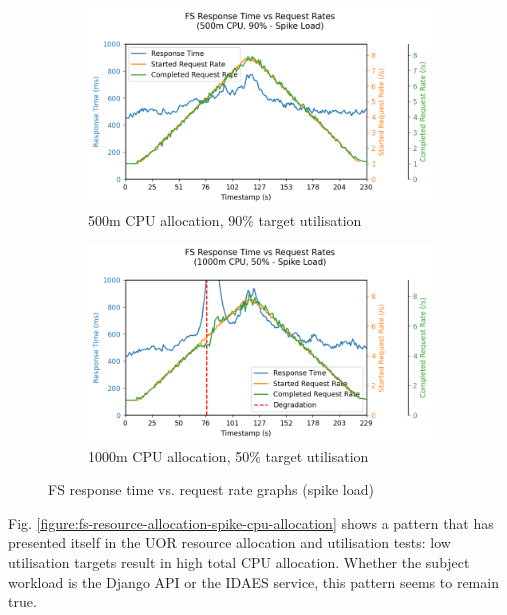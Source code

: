 \begin{figure}[h]
    \centering
    \begin{subfigure}{.5\textwidth}
      \centering
      \includegraphics[width=\linewidth]{figures/fs-rau-i4-response-curve-spike.png}
      \caption{500m CPU allocation, 90\% target utilisation}
    \end{subfigure}%
    \begin{subfigure}{.5\textwidth}
      \centering
      \includegraphics[width=\linewidth]{figures/fs-rau-i6-response-curve-spike.png}
      \caption{1000m CPU allocation, 50\% target utilisation}
    \end{subfigure}

    \caption{FS response time vs. request rate graphs (spike load)}
    \label{figure:fs-resource-allocation-rt-graph-i4-i6-spike}
\end{figure}

\noindent Fig. \ref{figure:fs-resource-allocation-spike-cpu-allocation} shows a pattern that has presented itself in the UOR resource allocation and utilisation tests: low utilisation targets result in high total CPU allocation. Whether the subject workload is the Django API or the IDAES service, this pattern seems to remain true.

